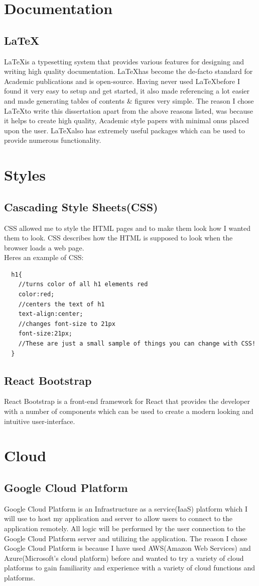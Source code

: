 \section{Documentation}
\subsection{\LaTeX}
\LaTeX  is a typesetting system that provides various features for designing and writing high quality documentation\cite{Latex}.  \LaTeX has become the de-facto standard for Academic publications and is open-source. Having never used \LaTeX before I found it very easy to setup and get started, it also made referencing a lot easier and made generating tables of contents \& figures very simple.  The reason I chose \LaTeX to write this dissertation apart from the above reasons listed, was because it helps to create high quality, Academic style papers with minimal onus placed upon the user.  \LaTeX also has extremely useful packages which can be used to provide numerous functionality.
\section{Styles}
\subsection{Cascading Style Sheets(CSS)}
CSS allowed me to style the HTML pages and to make them look how I wanted them to look.  CSS describes how the HTML is supposed to look when the browser loads a web page.
\\
Heres an example of CSS:
\begin{verbatim}
  h1{
    //turns color of all h1 elements red
    color:red;
    //centers the text of h1
    text-align:center;
    //changes font-size to 21px
    font-size:21px;
    //These are just a small sample of things you can change with CSS!
  }
\end{verbatim}
\subsection{React Bootstrap}
React Bootstrap is a front-end framework for React that provides the developer with a number of components which can be used to create a modern looking and intuitive user-interface.
\section{Cloud}
\subsection{Google Cloud Platform}
Google Cloud Platform is an Infrastructure as a service(IaaS) platform which I will use to host my application and server to allow users to connect to the application remotely\cite{GoogleCloudPlatform}.  All logic will be performed by the user connection to the Google Cloud Platform server and utilizing the application.  The reason I chose Google Cloud Platform is because I have used AWS(Amazon Web Services) and Azure(Microsoft's cloud platform) before and wanted to try a variety of cloud platforms to gain familiarity and experience with a variety of cloud functions and platforms. 
